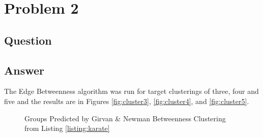 \section{Problem 2}

\subsection{Question}
\vspace*{10pt}


\subsection{Answer}
The Edge Betweenness algorithm was run for target clusterings of three, four and five and the results are in Figures \ref{fig:cluster3}, \ref{fig:cluster4}, and \ref{fig:cluster5}.

\begin{figure}[h!]
\centering
{}
\caption{Groups Predicted by Girvan \& Newman Betweenness Clustering from Listing \ref{listing:karate}}
\label{fig:output3}
\end{figure}

